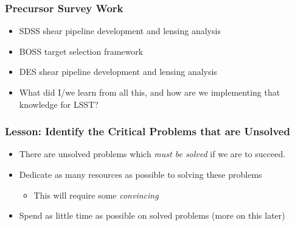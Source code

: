 \documentclass{beamer}
\begin{document}
\frame
{
    \frametitle{Precursor Survey Work}

    \begin{itemize}

        \item SDSS shear pipeline development and lensing analysis

        \item BOSS target selection framework

        \item DES shear pipeline development and lensing analysis

        \item What did I/we learn from all this, and how are we implementing
            that knowledge for LSST?

    \end{itemize}

}

\frame
{
    \frametitle{Lesson: Identify the Critical Problems that are Unsolved}

    \begin{itemize}

        \item There are unsolved problems which {\em must be solved} if we are to succeed.

        \item Dedicate as many resources as possible to solving these problems

            \begin{itemize}
                \item This will require some {\em convincing}
            \end{itemize}

        \item Spend as little time as possible on solved problems (more on this later)

    \end{itemize}

}
\end{document}
